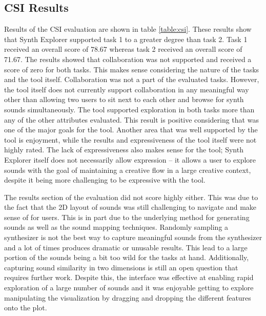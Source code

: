 \subsection{CSI Results}
Results of the CSI evaluation are shown in table \ref{table:csi}. These results show that Synth Explorer supported task 1 to a greater degree than task 2. Task 1 received an overall score of 78.67 whereas task 2 received an overall score of 71.67. The results showed that collaboration was not supported and received a score of zero for both tasks. This makes sense considering the nature of the tasks and the tool itself. Collaboration was not a part of the evaluated tasks. However, the tool itself does not currently support collaboration in any meaningful way other than allowing two users to sit next to each other and browse for synth sounds simultaneously. The tool supported exploration in both tasks more than any of the other attributes evaluated. This result is positive considering that was one of the major goals for the tool. Another area that was well supported by the tool is enjoyment, while the results and expressiveness of the tool itself were not highly rated. The lack of expressiveness also makes sense for the tool; Synth Explorer itself does not necessarily allow expression -- it allows a user to explore sounds with the goal of maintaining a creative flow in a large creative context, despite it being more challenging to be expressive with the tool.

The results section of the evaluation did not score highly either. This was due to the fact that the 2D layout of sounds was still challenging to navigate and make sense of for users. This is in part due to the underlying method for generating sounds as well as the sound mapping techniques. Randomly sampling a synthesizer is not the best way to capture meaningful sounds from the synthesizer and a lot of times produces dramatic or unusable results. This lead to a large portion of the sounds being a bit too wild for the tasks at hand. Additionally, capturing sound similarity in two dimensions is still an open question that requires further work. Despite this, the interface was effective at enabling rapid exploration of a large number of sounds and it was enjoyable getting to explore manipulating the visualization by dragging and dropping the different features onto the plot.

